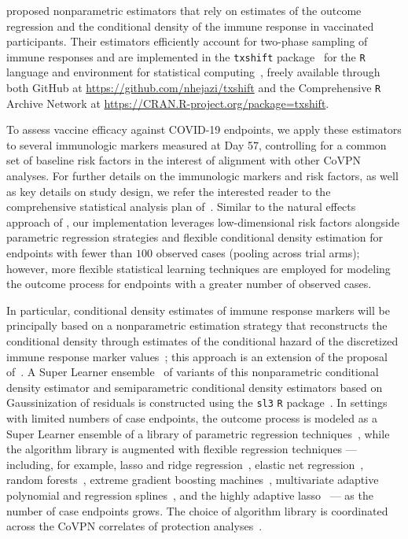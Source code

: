 \citet{hejazi2020efficient} proposed nonparametric estimators that rely on
estimates of the outcome regression and the conditional density of the immune
response in vaccinated participants. Their estimators efficiently account for
two-phase sampling of immune responses and are implemented in the
\texttt{txshift} package~\citep{hejazi2020txshift-joss} for the \texttt{R}
language and environment for statistical computing~\citep{R}, freely available
through both GitHub at \url{https://github.com/nhejazi/txshift} and the
Comprehensive \texttt{R} Archive Network at
\url{https://CRAN.R-project.org/package=txshift}.

To assess vaccine efficacy against COVID-19 endpoints, we apply these estimators
to several immunologic markers measured at Day 57, controlling for a common set
of baseline risk factors in the interest of alignment with other CoVPN analyses.
For further details on the immunologic markers and risk factors, as well as key
details on study design, we refer the interested reader to the comprehensive
statistical analysis plan of~\citet{gilbert2021covpn}. Similar to the natural
effects approach of \citet{benkeser2021inference}, our implementation leverages
low-dimensional risk factors alongside parametric regression strategies and
flexible conditional density estimation for endpoints with fewer than $100$
observed cases (pooling across trial arms); however, more flexible statistical
learning techniques are employed for modeling the outcome process for endpoints
with a greater number of observed cases.

In particular, conditional density estimates of immune response markers will be
principally based on a nonparametric estimation strategy that reconstructs the
conditional density through estimates of the conditional hazard of the
discretized immune response marker values~\citep{hejazi2020efficient,
hejazi2020efficient, hejazi2020haldensify}; this approach is an extension of the
proposal of~\citet{diaz2011super}. A Super Learner ensemble~\citep{vdl2007super}
of variants of this nonparametric conditional density estimator and
semiparametric conditional density estimators based on Gaussinization of
residuals is constructed using the \texttt{sl3} \texttt{R}
package~\citep{coyle2020sl3}. In settings with limited numbers of case
endpoints, the outcome process is modeled as a Super Learner ensemble of
a library of parametric regression
techniques~\citep[per][]{gruber2010application}, while the algorithm library is
augmented with flexible regression techniques --- including, for example, lasso
and ridge regression~\citep{tibshirani1996regression, tikhonov1977solutions,
hoerl1970ridge}, elastic net regression~\citep{zou2003regression,
friedman2009glmnet}, random forests~\citep{breiman2001random, wright2017ranger},
extreme gradient boosting machines~\citep{chen2016xgboost}, multivariate
adaptive polynomial and regression splines~\citep{friedman1991multivariate,
stone1994use, kooperberg1997polychotomous}, and the highly adaptive
lasso~\citep{vdl2017generally, benkeser2016highly, hejazi2020hal9001-joss} ---
as the number of case endpoints grows. The choice of algorithm library is
coordinated across the CoVPN correlates of protection
analyses~\citep{gilbert2021covpn}.

